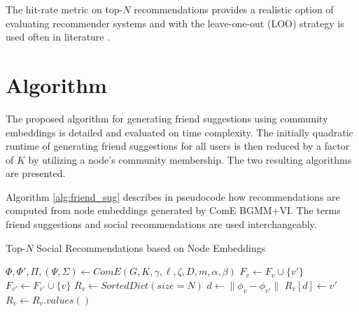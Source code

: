 \documentclass[conference]{IEEEtran}
\begin{document}
The hit-rate metric on top-$N$ recommendations provides a realistic option of evaluating recommender systems and with the leave-one-out (LOO) strategy is used often in literature \cite{Cremonesi2010PerformanceOR, Palumbo2017entity2rec, Zhao2019ATS, He2017NeuralCF}.


\section{Algorithm}

The proposed algorithm for generating friend suggestions using community embeddings is detailed and evaluated on time complexity. The initially quadratic runtime of generating friend suggestions for all users is then reduced by a factor of $K$ by utilizing a node's community membership. The two resulting algorithms are presented.

Algorithm \ref{alg:friend_sug} describes in pseudocode how recommendations are computed from node embeddings generated by ComE BGMM+VI. The terms friend suggestions and social recommendations are used interchangeably.

\begin{algorithm}
    \caption{Top-$N$ Social Recommendations based on Node Embeddings}
    \label{alg:friend_sug}
    \begin{algorithmic}[1]
        \State $\Phi, \Phi', \Pi, (\Psi,\Sigma) \leftarrow ComE(G, K, \gamma, \ell, \zeta, D, m, \alpha, \beta)$
        \State $F_v \leftarrow F_v \cup \{v'\}$
        \State $F_{v'} \leftarrow F_{v'} \cup \{v\}$
        \EndFor
        \State $R_v \leftarrow SortedDict(size=N)$
        \State $d \leftarrow \|\phi_v - \phi_{v'}\|$
        \State $R_v[d] \leftarrow v'$
        \EndFor
        \State $R_v  \leftarrow R_v.values()$
        \EndFor
    \end{algorithmic}
\end{algorithm}
\end{document}
